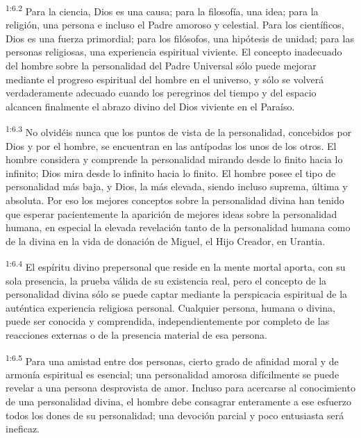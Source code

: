 \par
\textsuperscript{1:6.2} Para la ciencia, Dios es una causa; para la filosofía, una idea; para la religión, una persona e incluso el Padre amoroso y celestial. Para los científicos, Dios es una fuerza primordial; para los filósofos, una hipótesis de unidad; para las personas religiosas, una experiencia espiritual viviente. El concepto inadecuado del hombre sobre la personalidad del Padre Universal sólo puede mejorar mediante el progreso espiritual del hombre en el universo, y sólo se volverá verdaderamente adecuado cuando los peregrinos del tiempo y del espacio alcancen finalmente el abrazo divino del Dios viviente en el Paraíso.

\par
\textsuperscript{1:6.3} No olvidéis nunca que los puntos de vista de la personalidad, concebidos por Dios y por el hombre, se encuentran en las antípodas los unos de los otros. El hombre considera y comprende la personalidad mirando desde lo finito hacia lo infinito; Dios mira desde lo infinito hacia lo finito. El hombre posee el tipo de personalidad más baja, y Dios, la más elevada, siendo incluso suprema, última y absoluta. Por eso los mejores conceptos sobre la personalidad divina han tenido que esperar pacientemente la aparición de mejores ideas sobre la personalidad humana, en especial la elevada revelación tanto de la personalidad humana como de la divina en la vida de donación de Miguel, el Hijo Creador, en Urantia.

\par
\textsuperscript{1:6.4} El espíritu divino prepersonal que reside en la mente mortal aporta, con su sola presencia, la prueba válida de su existencia real, pero el concepto de la personalidad divina sólo se puede captar mediante la perspicacia espiritual de la auténtica experiencia religiosa personal. Cualquier persona, humana o divina, puede ser conocida y comprendida, independientemente por completo de las reacciones externas o de la presencia material de esa persona.

\par
\textsuperscript{1:6.5} Para una amistad entre dos personas, cierto grado de afinidad moral y de armonía espiritual es esencial; una personalidad amorosa difícilmente se puede revelar a una persona desprovista de amor. Incluso para acercarse al conocimiento de una personalidad divina, el hombre debe consagrar enteramente a ese esfuerzo todos los dones de su personalidad; una devoción parcial y poco entusiasta será ineficaz.

